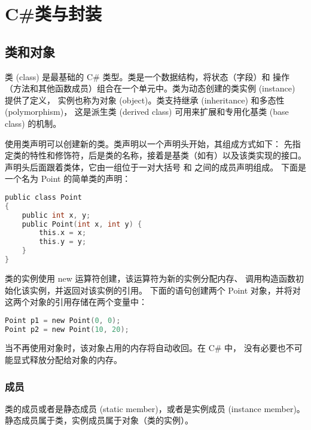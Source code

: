 ﻿%

\chapter{C\#类与封装}

\section{类和对象}
类 (class) 是最基础的 C\# 类型。类是一个数据结构，将状态（字段）和
操作（方法和其他函数成员）组合在一个单元中。类为动态创建的类实例 (instance) 提供了定义，
实例也称为对象 (object)。类支持继承 (inheritance) 和多态性 (polymorphism)，
这是派生类 (derived class) 可用来扩展和专用化基类 (base class) 的机制。

使用类声明可以创建新的类。类声明以一个声明头开始，其组成方式如下：
先指定类的特性和修饰符，后是类的名称，接着是基类（如有）以及该类实现的接口。
声明头后面跟着类体，它由一组位于一对大括号 { 和 } 之间的成员声明组成。
下面是一个名为 Point 的简单类的声明：

 \begin{lstlisting}[language=C] 
public class Point
{
    public int x, y;
    public Point(int x, int y) {
        this.x = x;
        this.y = y;
    }
}
\end{lstlisting}

类的实例使用 new 运算符创建，该运算符为新的实例分配内存、
调用构造函数初始化该实例，并返回对该实例的引用。
下面的语句创建两个 Point 对象，并将对这两个对象的引用存储在两个变量中：

 \begin{lstlisting}[language=C] 
Point p1 = new Point(0, 0);
Point p2 = new Point(10, 20);
\end{lstlisting}

当不再使用对象时，该对象占用的内存将自动收回。在 C\# 中，
没有必要也不可能显式释放分配给对象的内存。

\subsection{成员}
类的成员或者是静态成员 (static member)，或者是实例成员 (instance member)。
静态成员属于类，实例成员属于对象（类的实例）。

